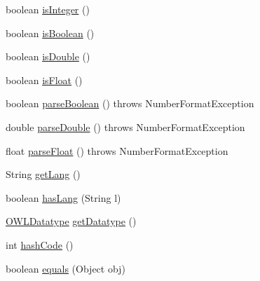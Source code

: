 \begin{DoxyCompactItemize}
boolean \hyperlink{classuk_1_1ac_1_1manchester_1_1cs_1_1owl_1_1owlapi_1_1_o_w_l_literal_impl_no_compression_a1a4f5d1116acd627f9da7ea73cc6fab9}{is\-Integer} ()
\item 
boolean \hyperlink{classuk_1_1ac_1_1manchester_1_1cs_1_1owl_1_1owlapi_1_1_o_w_l_literal_impl_no_compression_acf48d1fca3d14b2b8c2aecbdb28c13b5}{is\-Boolean} ()
\item 
boolean \hyperlink{classuk_1_1ac_1_1manchester_1_1cs_1_1owl_1_1owlapi_1_1_o_w_l_literal_impl_no_compression_afde0b543fe99ac33e8bd00397add4ad6}{is\-Double} ()
\item 
boolean \hyperlink{classuk_1_1ac_1_1manchester_1_1cs_1_1owl_1_1owlapi_1_1_o_w_l_literal_impl_no_compression_a3fbdd14979dea52a163a2547ec84bc63}{is\-Float} ()
\item 
boolean \hyperlink{classuk_1_1ac_1_1manchester_1_1cs_1_1owl_1_1owlapi_1_1_o_w_l_literal_impl_no_compression_a5a2765705aafe74765c47a76a1361155}{parse\-Boolean} ()  throws Number\-Format\-Exception 
\item 
double \hyperlink{classuk_1_1ac_1_1manchester_1_1cs_1_1owl_1_1owlapi_1_1_o_w_l_literal_impl_no_compression_aee3bb27c213e7fb261725a83686349b7}{parse\-Double} ()  throws Number\-Format\-Exception 
\item 
float \hyperlink{classuk_1_1ac_1_1manchester_1_1cs_1_1owl_1_1owlapi_1_1_o_w_l_literal_impl_no_compression_a6d4cc9059c5cb5e1e27409c136404d82}{parse\-Float} ()  throws Number\-Format\-Exception 
\item 
String \hyperlink{classuk_1_1ac_1_1manchester_1_1cs_1_1owl_1_1owlapi_1_1_o_w_l_literal_impl_no_compression_a94c4956544335bd91e6ab68774008263}{get\-Lang} ()
\item 
boolean \hyperlink{classuk_1_1ac_1_1manchester_1_1cs_1_1owl_1_1owlapi_1_1_o_w_l_literal_impl_no_compression_aea6028c6ea1d55320126290f2da96e45}{has\-Lang} (String l)
\item 
\hyperlink{interfaceorg_1_1semanticweb_1_1owlapi_1_1model_1_1_o_w_l_datatype}{O\-W\-L\-Datatype} \hyperlink{classuk_1_1ac_1_1manchester_1_1cs_1_1owl_1_1owlapi_1_1_o_w_l_literal_impl_no_compression_a49640a58a1cfb1d48f770d073f2ac2e6}{get\-Datatype} ()
\item 
int \hyperlink{classuk_1_1ac_1_1manchester_1_1cs_1_1owl_1_1owlapi_1_1_o_w_l_literal_impl_no_compression_a0b6305ed968fb0039df5462b2d4ba52f}{hash\-Code} ()
\item 
boolean \hyperlink{classuk_1_1ac_1_1manchester_1_1cs_1_1owl_1_1owlapi_1_1_o_w_l_literal_impl_no_compression_a9e80c760eb32a58d30663611632f4a4b}{equals} (Object obj)

\end{DoxyCompactItemize}
